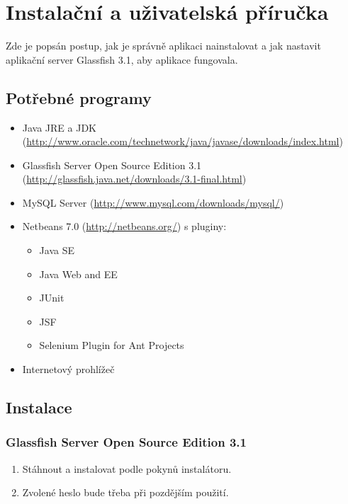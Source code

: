 \documentclass[11pt,twoside,a4paper]{book}
\begin{document}
\chapter{Instalační a uživatelská příručka}

Zde je popsán postup, jak je správně aplikaci nainstalovat a jak nastavit aplikační server Glassfish 3.1, aby aplikace fungovala.

\section{Potřebné programy}

\begin{itemize}
	\item Java JRE a JDK (\url{http://www.oracle.com/technetwork/java/javase/downloads/index.html})
	\item Glassfish Server Open Source Edition 3.1 (\url{http://glassfish.java.net/downloads/3.1-final.html})
	\item MySQL Server (\url{http://www.mysql.com/downloads/mysql/})	
	\item Netbeans 7.0 (\url{http://netbeans.org/}) s pluginy:
	\begin{itemize}
		\item Java SE
		\item Java Web and EE
		\item JUnit
		\item JSF
		\item Selenium Plugin for Ant Projects
	\end{itemize}
	\item Internetový prohlížeč
\end{itemize}

\section{Instalace}

\subsection{Glassfish Server Open Source Edition 3.1}

\begin{enumerate}
	\item Stáhnout a instalovat podle pokynů instalátoru.
	\item Zvolené heslo bude třeba při pozdějším použití.
\end{enumerate}
\end{document}
